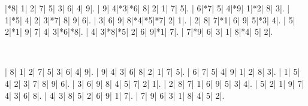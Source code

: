 \documentclass{cons-beamer}
\begin{document}
\begin{frame}[fragile]
  \begin{center}
    \vspace{2mm}
    \PuzzleUnitlength=11pt
    \renewcommand*\SudokuLinethickness{1pt}
    \renewcommand*\PuzzleFont{\sf\tiny}
    \begin{Sudoku}
      |*8| 1| 2| 7| 5| 3| 6| 4| 9|.
      | 9| 4|*3|*6| 8| 2| 1| 7| 5|.
      | 6|*7| 5| 4|*9| 1|*2| 8| 3|.
      | 1|*5| 4| 2| 3|*7| 8| 9| 6|.
      | 3| 6| 9| 8|*4|*5|*7| 2| 1|.
      | 2| 8| 7|*1| 6| 9| 5|*3| 4|.
      | 5| 2|*1| 9| 7| 4| 3|*6|*8|.
      | 4| 3|*8|*5| 2| 6| 9|*1| 7|.
      | 7|*9| 6| 3| 1| 8|*4| 5| 2|.
    \end{Sudoku}
    ~~~~~
    \PuzzleSolution
    \begin{Sudoku}
      | 8| 1| 2| 7| 5| 3| 6| 4| 9|.
      | 9| 4| 3| 6| 8| 2| 1| 7| 5|.
      | 6| 7| 5| 4| 9| 1| 2| 8| 3|.
      | 1| 5| 4| 2| 3| 7| 8| 9| 6|.
      | 3| 6| 9| 8| 4| 5| 7| 2| 1|.
      | 2| 8| 7| 1| 6| 9| 5| 3| 4|.
      | 5| 2| 1| 9| 7| 4| 3| 6| 8|.
      | 4| 3| 8| 5| 2| 6| 9| 1| 7|.
      | 7| 9| 6| 3| 1| 8| 4| 5| 2|.
    \end{Sudoku}
  \end{center}
  \vspace{-2mm}
  \begin{example} \footnotesize
    
  \end{example}
\end{frame}
\end{document}
